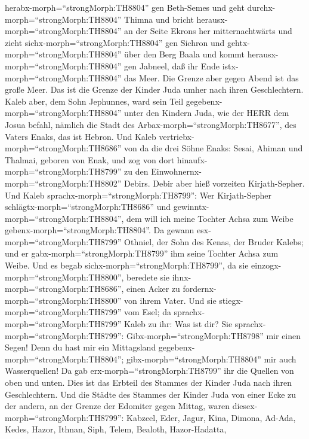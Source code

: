 herabx-morph=``strongMorph:TH8804'' gen Beth-Semes und geht
durchx-morph=``strongMorph:TH8804'' Thimna  und bricht
herausx-morph=``strongMorph:TH8804'' an der Seite Ekrons her
mitternachtwärts und zieht sichx-morph=``strongMorph:TH8804'' gen
Sichron und gehtx-morph=``strongMorph:TH8804'' über den Berg Baala und
kommt herausx-morph=``strongMorph:TH8804'' gen Jabneel, daß ihr Ende
istx-morph=``strongMorph:TH8804'' das Meer.  Die Grenze
aber gegen Abend ist das große Meer. Das ist die Grenze der Kinder Juda
umher nach ihren Geschlechtern.  Kaleb aber, dem Sohn
Jephunnes, ward sein Teil gegebenx-morph=``strongMorph:TH8804'' unter
den Kindern Juda, wie der HERR dem Josua befahl, nämlich die Stadt des
Arbax-morph=``strongMorph:TH8677'', des Vaters Enaks, das ist Hebron.
 Und Kaleb vertriebx-morph=``strongMorph:TH8686'' von da
die drei Söhne Enaks: Sesai, Ahiman und Thalmai, geboren von Enak,
 und zog von dort hinaufx-morph=``strongMorph:TH8799'' zu
den Einwohnernx-morph=``strongMorph:TH8802'' Debirs. Debir aber hieß
vorzeiten Kirjath-Sepher.  Und Kaleb
sprachx-morph=``strongMorph:TH8799'': Wer Kirjath-Sepher
schlägtx-morph=``strongMorph:TH8686'' und
gewinntx-morph=``strongMorph:TH8804'', dem will ich meine Tochter Achsa
zum Weibe gebenx-morph=``strongMorph:TH8804''.  Da gewann
esx-morph=``strongMorph:TH8799'' Othniel, der Sohn des Kenas, der Bruder
Kalebs; und er gabx-morph=``strongMorph:TH8799'' ihm seine Tochter Achsa
zum Weibe.  Und es begab
sichx-morph=``strongMorph:TH8799'', da sie
einzogx-morph=``strongMorph:TH8800'', beredete sie
ihnx-morph=``strongMorph:TH8686'', einen Acker zu
fordernx-morph=``strongMorph:TH8800'' von ihrem Vater. Und sie
stiegx-morph=``strongMorph:TH8799'' vom Esel; da
sprachx-morph=``strongMorph:TH8799'' Kaleb zu ihr: Was ist dir?
 Sie sprachx-morph=``strongMorph:TH8799'':
Gibx-morph=``strongMorph:TH8798'' mir einen Segen! Denn du hast mir ein
Mittagsland gegebenx-morph=``strongMorph:TH8804'';
gibx-morph=``strongMorph:TH8804'' mir auch Wasserquellen! Da gab
erx-morph=``strongMorph:TH8799'' ihr die Quellen von oben und unten.
 Dies ist das Erbteil des Stammes der Kinder Juda nach
ihren Geschlechtern.  Und die Städte des Stammes der Kinder
Juda von einer Ecke zu der andern, an der Grenze der Edomiter gegen
Mittag, waren diesex-morph=``strongMorph:TH8799'': Kabzeel, Eder, Jagur,
 Kina, Dimona, Ad-Ada,  Kedes, Hazor, Ithnan,
 Siph, Telem, Bealoth,  Hazor-Hadatta,
